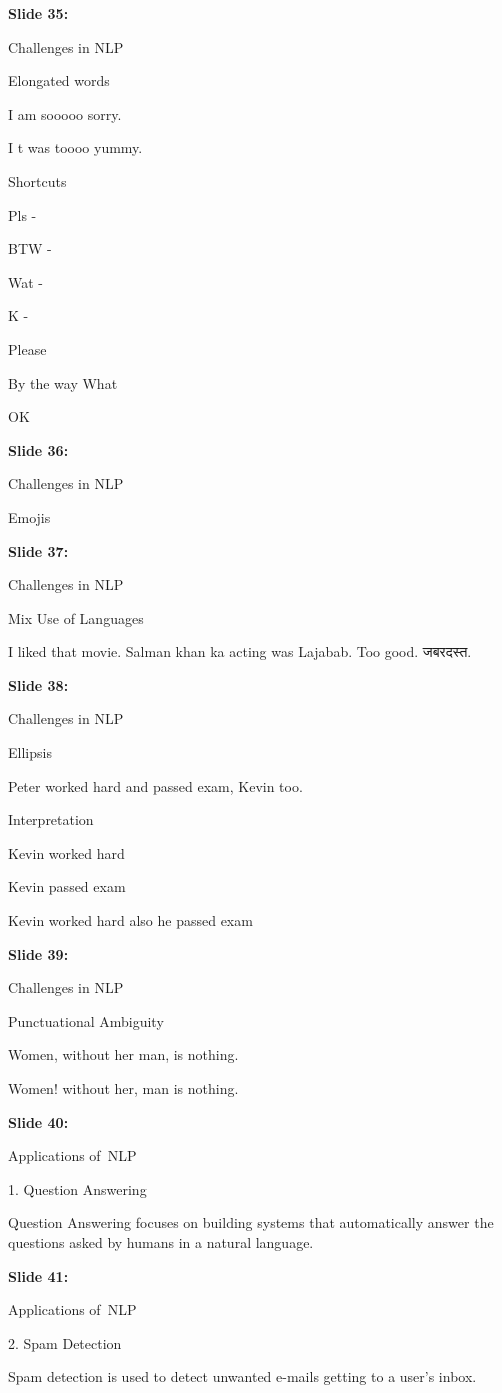 \documentclass[11pt,a4paper]{article}
\begin{document}
\textbf{Slide 35:}

Challenges in NLP

Elongated words

I am sooooo sorry.

I t was toooo yummy.

Shortcuts

Pls	-

BTW	-

Wat	-

K	-

Please

By the way  What

OK

\textbf{Slide 36:}

Challenges in NLP

Emojis

\textbf{Slide 37:}

Challenges in NLP

Mix Use of Languages

I liked that movie. Salman khan ka acting was  Lajabab. Too good. जबरदस्त.

\textbf{Slide 38:}

Challenges in NLP

Ellipsis

Peter worked hard and passed exam, Kevin too.

Interpretation

Kevin worked hard

Kevin passed exam

Kevin worked hard also he passed exam

\textbf{Slide 39:}

Challenges in NLP

Punctuational Ambiguity

Women, without her man, is nothing.

Women! without her, man is nothing.

\textbf{Slide 40:}

Applications of NLP

1. Question Answering

Question Answering focuses on building systems that automatically answer the questions asked by humans in a natural language.

\textbf{Slide 41:}

Applications of NLP

2. Spam Detection

Spam detection is used to detect unwanted e-mails getting to a user's inbox.
\end{document}
